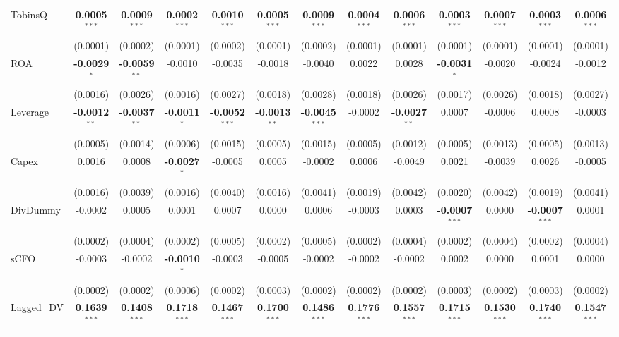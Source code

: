 \begin{landscape}
\begin{table}[H]
\begin{tabular}{lcccccccccccc}
TobinsQ & \textbf{0.0005}$^{***}$ & \textbf{0.0009}$^{***}$ & \textbf{0.0002}$^{***}$ & \textbf{0.0010}$^{***}$ & \textbf{0.0005}$^{***}$ & \textbf{0.0009}$^{***}$ & \textbf{0.0004}$^{***}$ & \textbf{0.0006}$^{***}$ & \textbf{0.0003}$^{***}$ & \textbf{0.0007}$^{***}$ & \textbf{0.0003}$^{***}$ & \textbf{0.0006}$^{***}$ \\
 & (0.0001) & (0.0002) & (0.0001) & (0.0002) & (0.0001) & (0.0002) & (0.0001) & (0.0001) & (0.0001) & (0.0001) & (0.0001) & (0.0001) \\
ROA & \textbf{-0.0029}$^{*}$ & \textbf{-0.0059}$^{**}$ & -0.0010 & -0.0035 & -0.0018 & -0.0040 & 0.0022 & 0.0028 & \textbf{-0.0031}$^{*}$ & -0.0020 & -0.0024 & -0.0012 \\
 & (0.0016) & (0.0026) & (0.0016) & (0.0027) & (0.0018) & (0.0028) & (0.0018) & (0.0026) & (0.0017) & (0.0026) & (0.0018) & (0.0027) \\
Leverage & \textbf{-0.0012}$^{**}$ & \textbf{-0.0037}$^{**}$ & \textbf{-0.0011}$^{*}$ & \textbf{-0.0052}$^{***}$ & \textbf{-0.0013}$^{**}$ & \textbf{-0.0045}$^{***}$ & -0.0002 & \textbf{-0.0027}$^{**}$ & 0.0007 & -0.0006 & 0.0008 & -0.0003 \\
 & (0.0005) & (0.0014) & (0.0006) & (0.0015) & (0.0005) & (0.0015) & (0.0005) & (0.0012) & (0.0005) & (0.0013) & (0.0005) & (0.0013) \\
Capex & 0.0016 & 0.0008 & \textbf{-0.0027}$^{*}$ & -0.0005 & 0.0005 & -0.0002 & 0.0006 & -0.0049 & 0.0021 & -0.0039 & 0.0026 & -0.0005 \\
 & (0.0016) & (0.0039) & (0.0016) & (0.0040) & (0.0016) & (0.0041) & (0.0019) & (0.0042) & (0.0020) & (0.0042) & (0.0019) & (0.0041) \\
DivDummy & -0.0002 & 0.0005 & 0.0001 & 0.0007 & 0.0000 & 0.0006 & -0.0003 & 0.0003 & \textbf{-0.0007}$^{***}$ & 0.0000 & \textbf{-0.0007}$^{***}$ & 0.0001 \\
 & (0.0002) & (0.0004) & (0.0002) & (0.0005) & (0.0002) & (0.0005) & (0.0002) & (0.0004) & (0.0002) & (0.0004) & (0.0002) & (0.0004) \\
sCFO & -0.0003 & -0.0002 & \textbf{-0.0010}$^{*}$ & -0.0003 & -0.0005 & -0.0002 & -0.0002 & -0.0002 & 0.0002 & 0.0000 & 0.0001 & 0.0000 \\
 & (0.0002) & (0.0002) & (0.0006) & (0.0002) & (0.0003) & (0.0002) & (0.0002) & (0.0002) & (0.0003) & (0.0002) & (0.0003) & (0.0002) \\
Lagged\_DV & \textbf{0.1639}$^{***}$ & \textbf{0.1408}$^{***}$ & \textbf{0.1718}$^{***}$ & \textbf{0.1467}$^{***}$ & \textbf{0.1700}$^{***}$ & \textbf{0.1486}$^{***}$ & \textbf{0.1776}$^{***}$ & \textbf{0.1557}$^{***}$ & \textbf{0.1715}$^{***}$ & \textbf{0.1530}$^{***}$ & \textbf{0.1740}$^{***}$ & \textbf{0.1547}$^{***}$ \\

\end{tabular}
\end{table}
\end{landscape}

